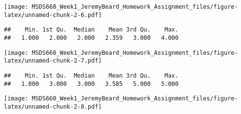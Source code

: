 \documentclass[
]{article}
\newenvironment{Shaded}{\begin{snugshade}}{\end{snugshade}}
\newcommand{\CommentTok}[1]{\textcolor[rgb]{0.56,0.35,0.01}{\textit{#1}}}
\newcommand{\FunctionTok}[1]{\textcolor[rgb]{0.00,0.00,0.00}{#1}}
\newcommand{\NormalTok}[1]{#1}
\newcommand{\SpecialCharTok}[1]{\textcolor[rgb]{0.00,0.00,0.00}{#1}}
\begin{document}
\texttt{[image: MSDS660\_Week1\_JeremyBeard\_Homework\_Assignment\_files/figure-latex/unnamed-chunk-2-6.pdf]}

\begin{Shaded}
\end{Shaded}

\begin{verbatim}
##    Min. 1st Qu.  Median    Mean 3rd Qu.    Max. 
##   1.000   2.000   2.000   2.359   3.000   4.000
\end{verbatim}

\begin{Shaded}
\end{Shaded}

\texttt{[image: MSDS660\_Week1\_JeremyBeard\_Homework\_Assignment\_files/figure-latex/unnamed-chunk-2-7.pdf]}

\begin{Shaded}
\end{Shaded}

\begin{verbatim}
##    Min. 1st Qu.  Median    Mean 3rd Qu.    Max. 
##   1.000   3.000   3.000   3.585   5.000   5.000
\end{verbatim}

\begin{Shaded}
\end{Shaded}

\texttt{[image: MSDS660\_Week1\_JeremyBeard\_Homework\_Assignment\_files/figure-latex/unnamed-chunk-2-8.pdf]}

\begin{Shaded}
\end{Shaded}
\end{document}
